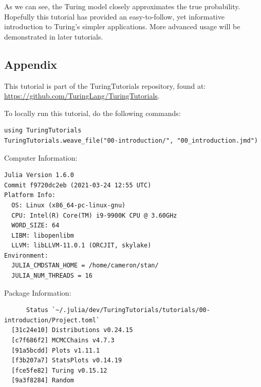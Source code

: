 \documentclass[12pt,a4paper]{article}
\begin{document}
As we can see, the Turing model closely approximates the true probability. Hopefully this tutorial has provided an easy-to-follow, yet informative introduction to Turing's simpler applications. More advanced usage will be demonstrated in later tutorials.



\subsection{Appendix}
This tutorial is part of the TuringTutorials repository, found at: \href{https://github.com/TuringLang/TuringTutorials}{https://github.com/TuringLang/TuringTutorials}.


To locally run this tutorial, do the following commands:

\begin{verbatim}
using TuringTutorials
TuringTutorials.weave_file("00-introduction/", "00_introduction.jmd")
\end{verbatim}

Computer Information:


\begin{verbatim}
Julia Version 1.6.0
Commit f9720dc2eb (2021-03-24 12:55 UTC)
Platform Info:
  OS: Linux (x86_64-pc-linux-gnu)
  CPU: Intel(R) Core(TM) i9-9900K CPU @ 3.60GHz
  WORD_SIZE: 64
  LIBM: libopenlibm
  LLVM: libLLVM-11.0.1 (ORCJIT, skylake)
Environment:
  JULIA_CMDSTAN_HOME = /home/cameron/stan/
  JULIA_NUM_THREADS = 16

\end{verbatim}

Package Information:


\begin{verbatim}
      Status `~/.julia/dev/TuringTutorials/tutorials/00-introduction/Project.toml`
  [31c24e10] Distributions v0.24.15
  [c7f686f2] MCMCChains v4.7.3
  [91a5bcdd] Plots v1.11.1
  [f3b207a7] StatsPlots v0.14.19
  [fce5fe82] Turing v0.15.12
  [9a3f8284] Random

\end{verbatim}
\end{document}
